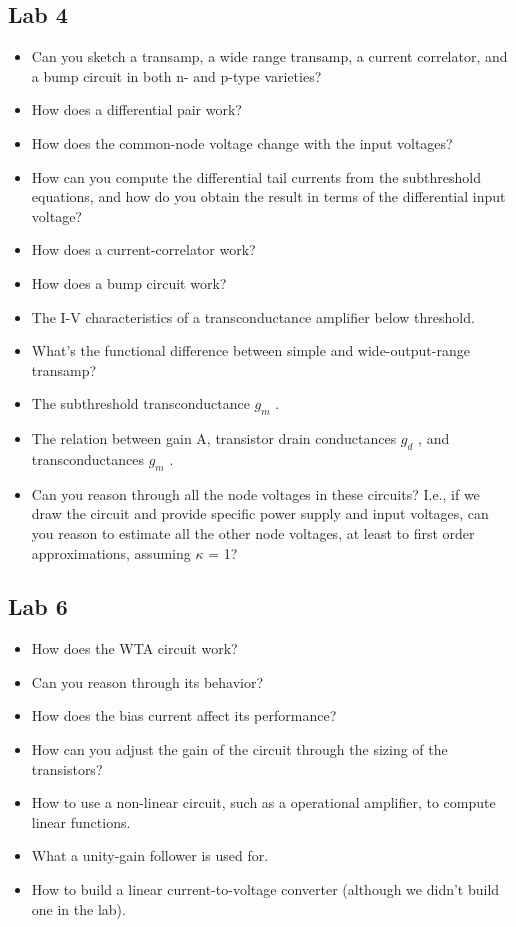 \documentclass[main]{subfiles}
\begin{document}
\subsection{Lab 4}
\begin{itemize}
\item Can you sketch a transamp, a wide range transamp, a current correlator, and a bump circuit in both n- and p-type varieties?
\item How does a differential pair work? 
\item How does the common-node voltage change with the input voltages? 
\item How can you compute the differential tail currents from the subthreshold equations, and how do you obtain the result in terms of the differential input voltage?
\item How does a current-correlator work? 
\item How does a bump circuit work?
\item The I-V characteristics of a transconductance amplifier below threshold. 
\item What’s the functional difference between simple and wide-output-range transamp? 
\item The subthreshold transconductance $g_m$ . 
\item The relation between gain A, transistor drain conductances $g_d$ , and transconductances $g_m$ .
\item Can you reason through all the node voltages in these circuits? I.e., if we draw the circuit and provide specific power supply and input voltages, can you reason to estimate all the other node voltages, at least to first order approximations, assuming $\kappa$ = 1?
\end{itemize}



\subsection{Lab 6}
\begin{itemize}
\item How does the WTA circuit work? 
\item Can you reason through its behavior? 
\item How does the bias current affect its performance? 
\item How can you adjust the gain of the circuit through the sizing of the transistors?
\item How to use a non-linear circuit, such as a operational amplifier, to compute
linear functions.
\item What a unity-gain follower is used for.
\item How to build a linear current-to-voltage converter (although we didn’t build one in the lab).
\end{itemize}
\end{document}
